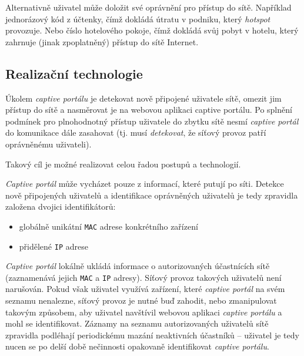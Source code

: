 \documentclass[thesis=M,czech]{FITthesis}[2012/10/20]
\begin{document}
Alternativně uživatel může doložit své oprávnění pro přístup do sítě. Například jednorázový kód z účtenky, čímž dokládá útratu v podniku, který \textit{hotspot} provozuje. Nebo číslo hotelového pokoje, čímž dokládá svůj pobyt v hotelu, který zahrnuje (jinak zpoplatněný) přístup do sítě Internet.


\subsection{Realizační technologie}


Úkolem \textit{captive portálu} je detekovat nově připojené uživatele sítě, omezit jim přístup do sítě a nasměrovat je na webovou aplikaci captive portálu. Po splnění podmínek pro plnohodnotný přístup uživatele do zbytku sítě nesmí \textit{captive portál} do komunikace dále zasahovat (tj. musí \textit{detekovat}, že síťový provoz patří oprávněnému uživateli).

Takový cíl je možné realizovat celou řadou postupů a technologií.

\textit{Captive portál} může vycházet pouze z informací, které putují po síti. Detekce nově připojených uživatelů a identifikace oprávněných uživatelů je tedy zpravidla založena dvojici identifikátorů:

\begin{itemize}
 \item globálně unikátní \texttt{MAC} adrese konkrétního zařízení
 \item přidělené \texttt{IP} adrese
\end{itemize}

\textit{Captive portál} lokálně ukládá informace o autorizovaných účastnících sítě (zaznamenává jejich \texttt{MAC} a \texttt{IP} adresy). Síťový provoz takových uživatelů není narušován. Pokud však uživatel využívá zařízení, které \textit{captive portál} na svém seznamu nenalezne, síťový provoz je nutné buď zahodit, nebo zmanipulovat takovým způsobem, aby uživatel navštívil webovou aplikaci \textit{captive portálu} a mohl se identifikovat. Záznamy na seznamu autorizovaných uživatelů sítě zpravidla podléhají periodickému mazání neaktivních účastníků -- uživatel je tedy nucen se po delší době nečinnosti opakovaně identifikovat \textit{captive portálu}.
\end{document}
